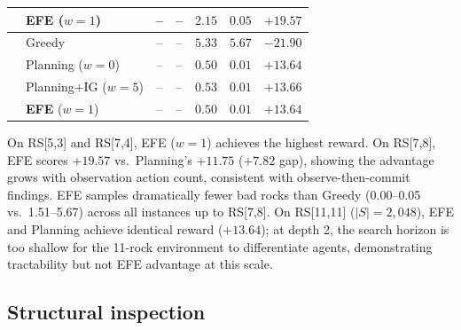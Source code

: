 \documentclass[runningheads]{llncs}
\begin{document}
\begin{table}[ht]
\begin{small}
\begin{tabular}{llccccc}
& \textbf{EFE} ($w{=}1$) & -- & -- & $\mathbf{2.15}$ & $\mathbf{0.05}$ & $\mathbf{+19.57}$ \\
\midrule
{} & Greedy & -- & -- & $5.33$ & $5.67$ & $-21.90$ \\
& Planning ($w{=}0$) & -- & -- & $0.50$ & $0.01$ & $+13.64$ \\
& Planning+IG ($w{=}5$) & -- & -- & $0.53$ & $0.01$ & $+13.66$ \\
& \textbf{EFE} ($w{=}1$) & -- & -- & $\mathbf{0.50}$ & $\mathbf{0.01}$ & $\mathbf{+13.64}$ \\
\bottomrule
\end{tabular}
\end{small}
\end{table}

On RS[5,3] and RS[7,4], EFE ($w{=}1$) achieves the highest reward. On RS[7,8], EFE scores $+19.57$ vs.\ Planning's $+11.75$ ($+7.82$ gap), showing the advantage grows with observation action count, consistent with observe-then-commit findings. EFE samples dramatically fewer bad rocks than Greedy (0.00--0.05 vs.\ 1.51--5.67) across all instances up to RS[7,8]. On RS[11,11] ($|S|{=}2{,}048$), EFE and Planning achieve identical reward ($+13.64$); at depth 2, the search horizon is too shallow for the 11-rock environment to differentiate agents, demonstrating tractability but not EFE advantage at this scale.

\subsection{Structural inspection}
\label{sec:inspection}
\end{document}
